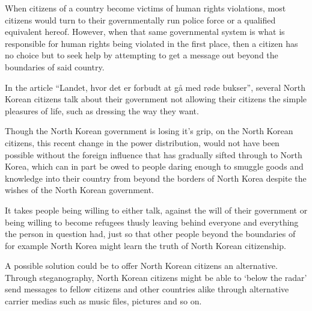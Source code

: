 When citizens of a country become victims of human rights violations, most citizens would turn to their governmentally run police force or a qualified equivalent hereof. However, when that same governmental system is what is responsible for human rights being violated in the first place, then a citizen has no choice but to seek help by attempting to get a message out beyond the boundaries of said country.

In the article “Landet, hvor det er forbudt at gå med røde bukser”, several North Korean citizens talk about their government not allowing their citizens the simple pleasures of life, such as dressing the way they want.

Though the North Korean government is losing it’s grip, on the North Korean citizens, this recent change in the power distribution, would not have been possible without the foreign influence that has gradually sifted through to North Korea, which can in part be owed to people daring enough to smuggle goods and knowledge into their country from beyond the borders of North Korea despite the wishes of the North Korean government.

It takes people being willing to either talk, against the will of their government or being willing to become refugees thusly leaving behind everyone and everything the person in question had, just so that other people beyond the boundaries of for example North Korea might learn the truth of North Korean citizenship.

A possible solution could be to offer North Korean citizens an alternative. Through steganography, North Korean citizens might be able to ‘below the radar’ send messages to fellow citizens and other countries alike through alternative carrier medias such as music files, pictures and so on.